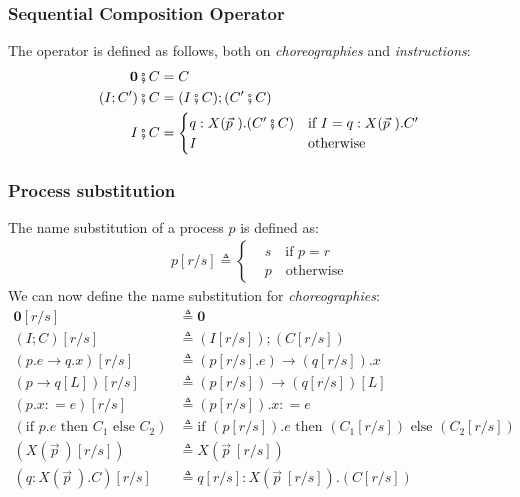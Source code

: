 \documentclass[12pt,a4paper,twoside]{book}
\newcommand{\metaDef}{\mathrel{\mathop:}=}
\newcommand{\gencom}{p.e \rightarrow q.x}
\newcommand{\gensel}{p \rightarrow q[L]}
\begin{document}
\subsubsection{Sequential Composition Operator}
The operator is defined as follows, both on \textit{choreographies} and \textit{instructions}:
\begin{align*}
	\boldsymbol{0} \fatsemi C &= C\\
    (I; C') \fatsemi C &= (I \fatsemi C); (C' \fatsemi C)\\
    I \fatsemi C &= 
    \begin{cases}
		q : X(\vec{p}~).(C' \fatsemi C) &\text{if $I = q : X(\vec{p}~).C' $}\\
		I &\text{otherwise}
    \end{cases}
\end{align*}

\subsubsection{Process substitution}
\label{intro:chor_subst}
The name substitution of a process $p$ is defined as:
\begin{align*}
    p[r/s] \triangleq
    \begin{cases}
    &s \quad \text{if $p = r$}\\
    &p \quad \text{otherwise}
    \end{cases}
\end{align*}
We can now define the name substitution for \textit{choreographies}:
\begin{align*}
	\boldsymbol{0}[r/s] &\triangleq \boldsymbol{0}\\
    (I; C)[r/s] &\triangleq (I[r/s]); (C[r/s])\\
    (\gencom)[r/s] &\triangleq (p[r/s].e) \rightarrow (q[r/s]).x\\
    (\gensel)[r/s] &\triangleq (p[r/s]) \rightarrow (q[r/s])[L]\\
    (p.x \metaDef e)[r/s] &\triangleq (p[r/s]).x \metaDef e\\
    (\text{if } p.e\text{ then } C_1\text{ else } C_2) &\triangleq \text{if }(p[r/s]).e \text{ then }(C_1[r/s]) \text{ else } (C_2[r/s])\\
    (X(\vec{p}~)[r/s]) &\triangleq X(\vec{p}~[r/s])\\
	(q : X(\vec{p}~).C) [r/s] &\triangleq q[r/s] : X(\vec{p}~[r/s]).(C[r/s])\\
\end{align*}
\end{document}
